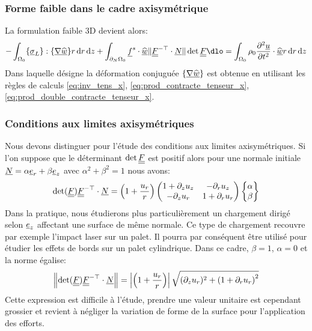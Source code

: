 \documentclass[10pt]{book}
\begin{document}
\subsubsection{Forme faible dans le cadre axisymétrique}
La formulation faible 3D devient alors:
$$-\int_{\Configuration_{0}}\{\vec{\sigma}_{L}\}:\{\vec{\nabla}\DepVirt\}r\dr\dz+\int_{\dNOm_{0}}\FSurf\cdot\DepVirt\Vert\GT^{-\top}\cdot\NormaleInit\Vert\det\GT\dlo=\int_{\Configuration_{0}}\rho_{0}\dfrac{\partial^{2}\Dep}{\partial t^{2}}\cdot\DepVirt r\dr\dz$$
Dans laquelle désigne la déformation conjuguée $\{\underline{\nabla}\widehat{\underline{w}}\}$ est obtenue en utilisant les règles de calculs \eqref{eq:inv_tens_x}, \eqref{eq:prod_contracte_tenseur_x}, \eqref{eq:prod_double_contracte_tenseur_x}.
\subsubsection{Conditions aux limites axisymétriques}
Nous devons distinguer pour l'étude des conditions aux limites axisymétriques. Si l'on suppose que le déterminant $\det\underline{\underline{F}}$ est positif alors pour une normale initiale $\underline{N}=\alpha\underline{e}_{r}+\beta\underline{e}_{z}$ avec $\alpha^{2}+\beta^{2}=1$ nous avons: 
$$\det(\underline{\underline{F}})\underline{\underline{F}}^{-\top}\cdot\underline{N}=\left(1+\frac{u_{r}}{r}\right)\begin{pmatrix}
1+\partial_{z}u_{z} & -\partial_{r}u_{z}\\
 -\partial_{z}u_{r}& 1+\partial_{r}u_{r}
\end{pmatrix}\begin{Bmatrix}
\alpha\\
\beta\end{Bmatrix}$$
Dans la pratique, nous étudierons plus particulièrement un chargement dirigé selon $\underline{e}_{z}$ affectant une surface de même normale. Ce type de chargement recouvre par exemple l'impact laser sur un palet. Il pourra par conséquent être utilisé pour étudier les effets de bords sur un palet cylindrique. Dans ce cadre, $\beta=1$, $\alpha=0$ et la norme égalise:
$$\left\Vert\det(\underline{\underline{F}})\underline{\underline{F}}^{-\top}\cdot\underline{N}\right\Vert=\left|\left(1+\frac{u_{r}}{r}\right)\right|\sqrt{(\partial_{z}u_{r})^{2}+\left(1+\partial_{r}u_{r}\right)^{2}}$$
Cette expression est difficile à l'étude, prendre une valeur unitaire est cependant grossier et revient à négliger la variation de forme de la surface pour l'application des efforts.
\end{document}
